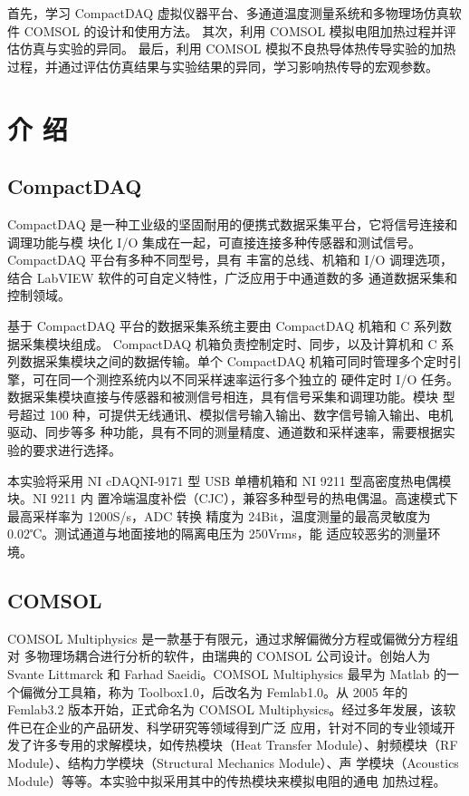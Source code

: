 \documentclass[10pt,a4paper,twoside,UTF8]{ctexart}
\begin{document}
首先，学习 CompactDAQ 虚拟仪器平台、多通道温度测量系统和多物理场仿真软件 COMSOL 的设计和使用方法。
其次，利用 COMSOL 模拟电阻加热过程并评估仿真与实验的异同。
最后，利用 COMSOL 模拟不良热导体热传导实验的加热过程，并通过评估仿真结果与实验结果的异同，学习影响热传导的宏观参数。

\section{介 \quad 绍\autocite{shenGeneralPhysicsLaboratory2015}}

\subsection{CompactDAQ}
CompactDAQ 是一种工业级的坚固耐用的便携式数据采集平台，它将信号连接和调理功能与模
块化 I/O 集成在一起，可直接连接多种传感器和测试信号。CompactDAQ 平台有多种不同型号，具有
丰富的总线、机箱和 I/O 调理选项，结合 LabVIEW 软件的可自定义特性，广泛应用于中通道数的多
通道数据采集和控制领域。

基于 CompactDAQ 平台的数据采集系统主要由 CompactDAQ 机箱和 C 系列数据采集模块组成。
CompactDAQ 机箱负责控制定时、同步，以及计算机和 C 系列数据采集模块之间的数据传输。单个
CompactDAQ 机箱可同时管理多个定时引擎，可在同一个测控系统内以不同采样速率运行多个独立的
硬件定时 I/O 任务。数据采集模块直接与传感器和被测信号相连，具有信号采集和调理功能。模块
型号超过 100 种，可提供无线通讯、模拟信号输入输出、数字信号输入输出、电机驱动、同步等多
种功能，具有不同的测量精度、通道数和采样速率，需要根据实验的要求进行选择。

本实验将采用 NI cDAQNI-9171 型 USB 单槽机箱和 NI 9211 型高密度热电偶模块。NI 9211 内
置冷端温度补偿（CJC），兼容多种型号的热电偶温。高速模式下最高采样率为 1200S/s，ADC 转换
精度为 24Bit，温度测量的最高灵敏度为 0.02℃。测试通道与地面接地的隔离电压为 250Vrms，能
适应较恶劣的测量环境。

\subsection{COMSOL}
COMSOL Multiphysics 是一款基于有限元，通过求解偏微分方程或偏微分方程组对
多物理场耦合进行分析的软件，由瑞典的 COMSOL 公司设计。创始人为 Svante Littmarck
和 Farhad Saeidi。COMSOL Multiphysics 最早为 Matlab 的一个偏微分工具箱，称为
Toolbox1.0，后改名为 Femlab1.0。从 2005 年的 Femlab3.2 版本开始，正式命名为 COMSOL 
Multiphysics。经过多年发展，该软件已在企业的产品研发、科学研究等领域得到广泛
应用，针对不同的专业领域开发了许多专用的求解模块，如传热模块（Heat Transfer 
Module）、射频模块（RF Module）、结构力学模块（Structural Mechanics Module）、声
学模块（Acoustics Module）等等。本实验中拟采用其中的传热模块来模拟电阻的通电
加热过程。
\end{document}
